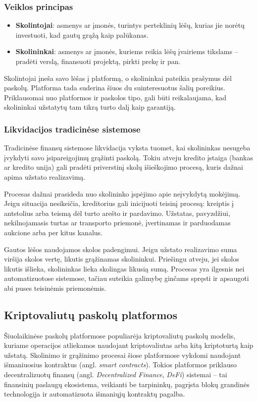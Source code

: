 \documentclass[]{VUMIFTemplateClass}
\begin{document}
\subsubsection{Veiklos principas}
\begin{itemize}
    \item \textbf{Skolintojai}: asmenys ar įmonės, turintys perteklinių lėšų, kurias jie norėtų investuoti, kad gautų grąžą kaip palūkanas.
    \item \textbf{Skolininkai}: asmenys ar įmonės, kuriems reikia lėšų įvairiems tikslams – pradėti verslą, finansuoti projektą, pirkti prekę ir pan.
\end{itemize}

Skolintojai įneša savo lėšas į platformą, o skolininkai pateikia prašymus dėl paskolų. Platforma tada suderina šiuos du suinteresuotus šalių poreikius. Priklausomai nuo platformos ir paskolos tipo, gali būti reikalaujama, kad skolininkai užstatytų tam tikrą turto dalį kaip garantiją.

\subsubsection{Likvidacijos tradicinėse sistemose}
Tradicinėse finansų sistemose likvidacija vyksta tuomet, kai skolininkas nesugeba įvykdyti savo įsipareigojimų grąžinti paskolą. Tokiu atveju kredito įstaiga (bankas ar kredito unija) gali pradėti priverstinį skolų išieškojimo procesą, kuris dažnai apima užstato realizavimą.

Procesas dažnai prasideda nuo skolininko įspėjimo apie neįvykdytą mokėjimą. Jeigu situacija nesikeičia, kreditorius gali inicijuoti teisinį procesą: kreiptis į antstolius arba teismą dėl turto arešto ir pardavimo. Užstatas, pavyzdžiui, nekilnojamasis turtas ar transporto priemonė, įvertinamas ir parduodamas aukcione arba per kitus kanalus.

Gautos lėšos naudojamos skolos padengimui. Jeigu užstato realizavimo suma viršija skolos vertę, likutis grąžinamas skolininkui. Priešingu atveju, jei skolos likutis išlieka, skolininkas lieka skolingas likusią sumą. Procesas yra ilgesnis nei automatizuotose sistemose, tačiau suteikia galimybę ginčams spręsti ir apsaugoti abi puses teisinėmis priemonėmis.

\subsection{Kriptovaliutų paskolų platformos}
Šiuolaikinėse paskolų platformose populiarėja kriptovaliutų paskolų modelis, kuriame operacijos atliekamos naudojant kriptovaliutas arba kitą kriptoturtą kaip užstatą. Skolinimo ir grąžinimo procesai šiose platformose vykdomi naudojant išmaniuosius kontraktus (angl. \textit{smart contracts}). Tokios platformos priklauso decentralizuotų finansų (angl. \textit{Decentralized Finance}, \textit{DeFi}) sistemai – tai finansinių paslaugų ekosistema, veikianti be tarpininkų, pagrįsta blokų grandinės technologija ir automatizuota išmaniųjų kontraktų pagalba.
\end{document}
